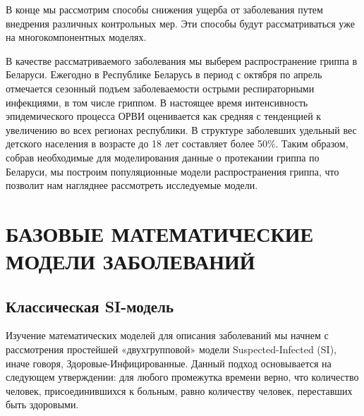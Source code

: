 \documentclass[a4paper, 14pt]{extreport}
\begin{document}
	В конце мы рассмотрим способы снижения ущерба от заболевания путем внедрения различных контрольных мер. Эти способы будут рассматриваться уже на многокомпонентных моделях.
	
	В качестве рассматриваемого заболевания мы выберем распространение гриппа в Беларуси. Ежегодно в Республике Беларусь в период с октября по апрель отмечается сезонный подъем заболеваемости острыми респираторными инфекциями, в том числе гриппом. В настоящее время интенсивность эпидемического процесса ОРВИ оценивается как средняя с тенденцией к увеличению во всех регионах республики. В структуре заболевших удельный вес детского населения в возрасте до 18 лет составляет более 50\%. Таким образом, собрав необходимые для моделирования данные о протекании гриппа по Беларуси, мы построим популяционные модели распространения гриппа, что позволит нам нагляднее рассмотреть исследуемые модели.
	
	
	
	\newpage
	\chapter{БАЗОВЫЕ МАТЕМАТИЧЕСКИЕ МОДЕЛИ ЗАБОЛЕВАНИЙ}
	\section{Классическая SI-модель}
	Изучение математических моделей для описания заболеваний мы начнем с рассмотрения простейшей «двухгрупповой» модели Suspected-Infected (SI), иначе говоря, Здоровые-Инфицированные.
	Данный подход основывается на следующем утверждении: для любого промежутка времени верно, что количество человек, присоединившихся к больным, равно количеству человек, переставших быть здоровыми. 
	
\end{document}
